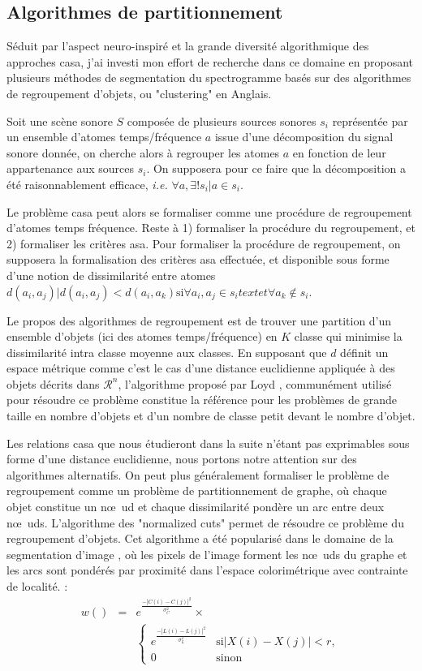 \subsection{Algorithmes de partitionnement}

Séduit par l'aspect neuro-inspiré et la grande diversité algorithmique des approches casa, j'ai investi mon effort de recherche dans ce domaine en proposant plusieurs méthodes de segmentation du spectrogramme basés sur des algorithmes de regroupement d'objets, ou "clustering" en Anglais.

Soit une scène sonore $S$ composée de plusieurs sources sonores $s_i$ représentée par un ensemble d'atomes temps/fréquence $a$ issue d'une décomposition du signal sonore donnée, on cherche alors à regrouper les atomes $a$ en fonction de leur appartenance aux sources $s_i$. On supposera pour ce faire que la décomposition a été raisonnablement efficace, \textit{i.e.} $\forall a, \exists ! s_i | a \in s_i$.

Le problème casa peut alors se formaliser comme une procédure de regroupement d'atomes temps fréquence. Reste à 1) formaliser la procédure du regroupement, et 2) formaliser les critères asa. Pour formaliser la procédure de regroupement, on supposera la formalisation des critères asa effectuée, et disponible sous forme d'une notion de dissimilarité entre atomes $d(a_i, a_j) | d(a_i, a_j) < d(a_i, a_k) \text{si} \forall a_i, a_j \in s_i text{et} \forall a_k \notin s_i$.

Le propos des algorithmes de regroupement est de trouver une partition d'un ensemble d'objets (ici des atomes temps/fréquence) en $K$ classe qui minimise la dissimilarité intra classe moyenne aux classes. En supposant que $d$ définit un espace métrique comme c'est le cas d'une distance euclidienne appliquée à des objets décrits dans $\mathcal{R}^n$, l'algorithme proposé par Loyd \cite{}, communément utilisé pour résoudre ce problème constitue la référence pour les problèmes de grande taille en nombre d'objets et d'un nombre de classe petit devant le nombre d'objet.

Les relations casa que nous étudieront dans la suite n'étant pas exprimables sous forme d'une distance euclidienne, nous portons notre attention sur des algorithmes alternatifs. On peut plus généralement formaliser le problème de regroupement comme un problème de partitionnement de graphe, où chaque objet constitue un n\oe~ud et chaque dissimilarité pondère un arc entre deux n\oe~uds. L'algorithme des "normalized cuts" permet de résoudre ce problème du regroupement d'objets. Cet algorithme a été popularisé dans le domaine de la segmentation d'image \cite{shi2000normalized}, où les pixels de l'image forment les n\oe~uds du graphe et les arcs sont pondérés par proximité dans l'espace colorimétrique avec contrainte de localité.  :
\begin{eqnarray}
w() &=& e^{\frac{-|C(i)-C(j)|^2}{\sigma^2_C}} \times \\
&&  \begin{cases}
e^{\frac{-|L(i)-L(j)|^2}{\sigma^2_L}} & \text{si} |X(i)-X(j)| < r, \\
0 & \text{sinon}
\end{cases}
\label{eq:shi}
\end{eqnarray}

